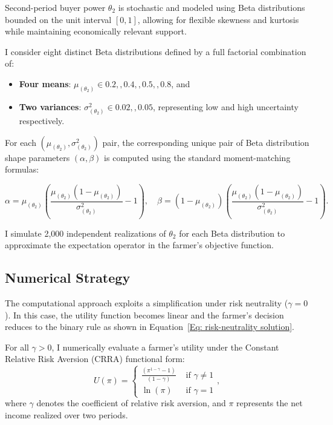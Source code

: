 Second-period buyer power $\theta_2$ is stochastic and modeled using Beta distributions bounded on the unit interval $[0,1]$, allowing for flexible skewness and kurtosis while maintaining economically relevant support.

I consider eight distinct Beta distributions defined by a full factorial combination of:
\begin{itemize}
\item \textbf{Four means}: $\mu_{(\theta_2)} \in {0.2,,0.4,,0.5,,0.8}$, and
\item \textbf{Two variances}: $\sigma^2_{(\theta_2)} \in {0.02,,0.05}$, representing low and high uncertainty respectively.
\end{itemize}

For each $(\mu_{(\theta_2)}, \sigma^2_{(\theta_2)})$ pair, the corresponding unique pair of Beta distribution shape parameters $(\alpha, \beta)$ is computed using the standard moment-matching formulas:

$$
\alpha = \mu_{(\theta_2)} \left( \frac{\mu_{(\theta_2)}(1 - \mu_{(\theta_2)})}{\sigma^2_{(\theta_2)}} - 1 \right), \quad
\beta = (1 - \mu_{(\theta_2)}) \left( \frac{\mu_{(\theta_2)}(1 - \mu_{(\theta_2)})}{\sigma^2_{(\theta_2)}} - 1 \right).
$$

I simulate 2,000 independent realizations of $\theta_2$ for each Beta distribution to approximate the expectation operator in the farmer's objective function.




\subsection{Numerical Strategy}
\noindent The computational approach exploits a simplification under risk neutrality ($\gamma = 0$). In this case, the utility function becomes linear and the farmer's decision reduces to the binary rule as shown in Equation~\ref{Eq: risk-neutrality solution}.

For all $\gamma > 0$, I numerically evaluate a farmer's utility under the Constant Relative Risk Aversion (CRRA) functional form:
\begin{equation}
U(\pi)=\left\{\begin{array}{ll}
\frac{\left(\pi^{1-\gamma}-1\right)}{(1-\gamma)} & \text { if } \gamma \neq 1 \\
\ln (\pi) & \text { if } \gamma=1
\end{array},\right.
\label{eq: CRRA}
\end{equation}
where $\gamma$ denotes the coefficient of relative risk aversion, and $\pi$ represents the net income realized over two periods. 

